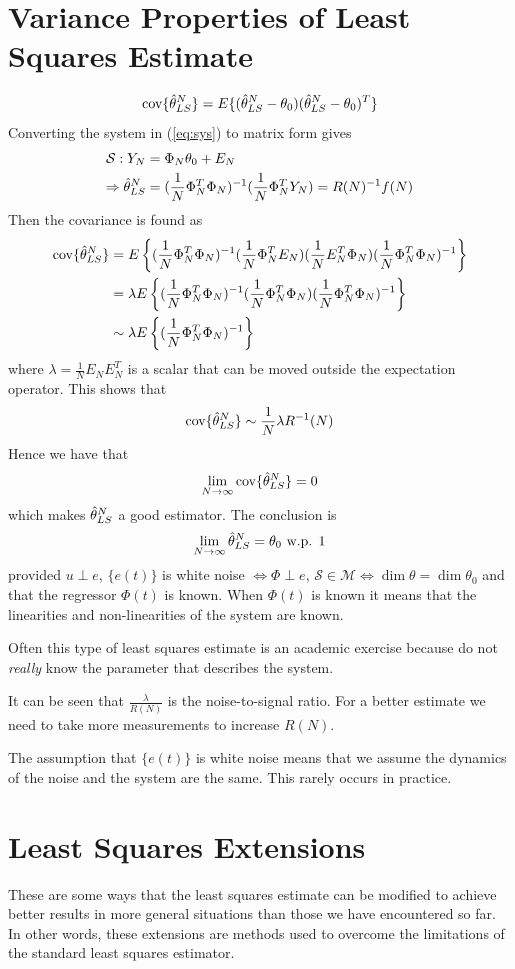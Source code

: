 \section{Variance Properties of Least Squares Estimate}
$$\text{cov}\{\hat{\theta}_{LS}^N\} = E\{(\hat{\theta}_{LS}^N-\theta_0)(\hat{\theta}_{LS}^N-\theta_0)^T\}$$
Converting the system in (\ref{eq:sys}) to matrix form gives
\begin{align*}
\mathcal{S}: Y_N &= \Phi_N\theta_0+E_N \\
\Rightarrow \hat{\theta}_{LS}^N &= (\frac{1}{N}\Phi_N^T\Phi_N)^{-1}(\frac{1}{N}\Phi_N^TY_N) = R(N)^{-1}f(N)
\end{align*}
Then the covariance is found as
\begin{align*}
\text{cov}\{\hat{\theta}_{LS}^N\} &= E\left\lbrace(\frac{1}{N}\Phi_N^T\Phi_N)^{-1} (\frac{1}{N}\Phi_N^TE_N) (\frac{1}{N}E_N^T\Phi_N) (\frac{1}{N}\Phi_N^T\Phi_N)^{-1}\right\rbrace \\
&= \lambda E\left\lbrace(\frac{1}{N}\Phi_N^T\Phi_N)^{-1} (\frac{1}{N}\Phi_N^T\Phi_N) (\frac{1}{N}\Phi_N^T\Phi_N)^{-1}\right\rbrace \\
&\sim \lambda E\left\lbrace(\frac{1}{N}\Phi_N^T\Phi_N)^{-1}\right\rbrace
\end{align*}
where $\lambda = \frac{1}{N}E_NE_N^T$ is a scalar that can be moved outside the expectation operator. This shows that
$$\text{cov}\{\hat{\theta}_{LS}^N\} \sim \frac{1}{N}\lambda R^{-1}(N)$$
Hence we have that
$$\lim_{N\to\infty}\text{cov}\{\hat{\theta}_{LS}^N\} = 0$$
which makes $\hat{\theta}_{LS}^N$ a good estimator. The conclusion is
$$\lim_{N\to\infty}\hat{\theta}_{LS}^N = \theta_0 \text{ w.p. } 1$$
provided $u\perp e$, $\{e(t)\}$ is white noise $\Leftrightarrow \Phi\perp e$, $\mathcal{S}\in\mathcal{M} \Leftrightarrow \dim\theta = \dim\theta_0$ and that the regressor $\Phi(t)$ is known. When $\Phi(t)$ is known it means that the linearities and non-linearities of the system are known.

Often this type of least squares estimate is an academic exercise because do not \textit{really} know the parameter that describes the system.

It can be seen that $\frac{\lambda}{R(N)}$ is the noise-to-signal ratio. For a better estimate we need to take more measurements to increase $R(N)$.

The assumption that $\{e(t)\}$ is white noise means that we assume the dynamics of the noise and the system are the same. This rarely occurs in practice.

\section{Least Squares Extensions}
These are some ways that the least squares estimate can be modified to achieve better results in more general situations than those we have encountered so far. In other words, these extensions are methods used to overcome the limitations of the standard least squares estimator.

